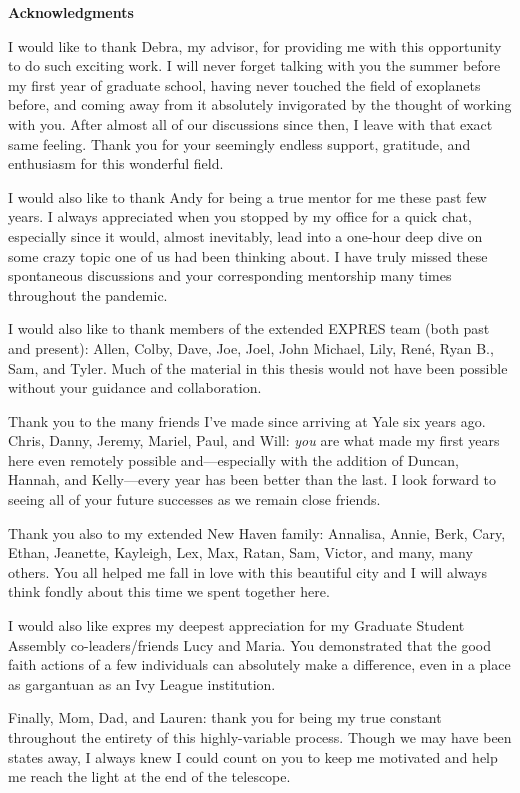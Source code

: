 \begin{center}
{\bf \large Acknowledgments}
\end{center}

I would like to thank Debra, my advisor, for providing me with this opportunity to do such exciting work. I will never forget talking with you the summer before my first year of graduate school, having never touched the field of exoplanets before, and coming away from it absolutely invigorated by the thought of working with you. After almost all of our discussions since then, I leave with that exact same feeling. Thank you for your seemingly endless support, gratitude, and enthusiasm for this wonderful field.

I would also like to thank Andy for being a true mentor for me these past few years. I always appreciated when you stopped by my office for a quick chat, especially since it would, almost inevitably, lead into a one-hour deep dive on some crazy topic one of us had been thinking about. I have truly missed these spontaneous discussions and your corresponding mentorship many times throughout the pandemic.

I would also like to thank members of the extended EXPRES team (both past and present): Allen, Colby, Dave, Joe, Joel, John Michael, Lily, Ren\'e, Ryan B., Sam, and Tyler. Much of the material in this thesis would not have been possible without your guidance and collaboration.

Thank you to the many friends I've made since arriving at Yale six years ago. Chris, Danny, Jeremy, Mariel, Paul, and Will: \textit{you} are what made my first years here even remotely possible and---especially with the addition of Duncan, Hannah, and Kelly---every year has been better than the last. I look forward to seeing all of your future successes as we remain close friends.

Thank you also to my extended New Haven family: Annalisa, Annie, Berk, Cary, Ethan, Jeanette, Kayleigh, Lex, Max, Ratan, Sam, Victor, and many, many others. You all helped me fall in love with this beautiful city and I will always think fondly about this time we spent together here.

I would also like expres my deepest appreciation for my Graduate Student Assembly co-leaders/friends Lucy and Maria. You demonstrated that the good faith actions of a few individuals can absolutely make a difference, even in a place as gargantuan as an Ivy League institution.

Finally, Mom, Dad, and Lauren: thank you for being my true constant throughout the entirety of this highly-variable process. Though we may have been states away, I always knew I could count on you to keep me motivated and help me reach the light at the end of the telescope.